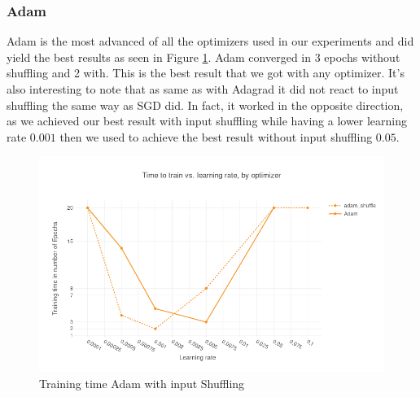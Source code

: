 \subsubsection{Adam}
Adam is the most advanced of all the optimizers used in our experiments and did yield the best results as seen in Figure \ref{fig:results_adam_shuffle}. Adam converged in 3 epochs without shuffling and 2 with. This is the best result that we got with any optimizer.  It's also interesting to note that as same as with Adagrad it did not react to input shuffling the same way as SGD did. In fact, it worked in the opposite direction, as we achieved our best result with input shuffling while having a lower learning rate $0.001$ then we used to achieve the best result without input shuffling $0.05$.
\begin{figure}[h]
    \centering
            \includegraphics[scale=0.45]{images/results_adam_shuffle} 
    \caption{Training time Adam with input Shuffling}
    \label{fig:results_adam_shuffle}
\end{figure}